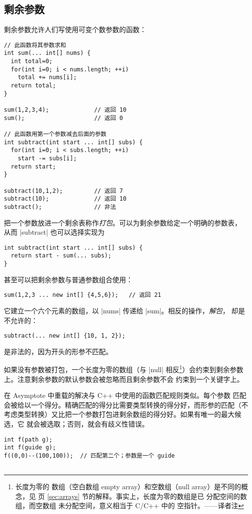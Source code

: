 \documentclass[nofonts,CJKnormalspaces]{ctexbook}[2009/05/20]
\newcommand*\prgname[1]{\textsf{#1}}
\newcommand\transnote[1]{\footnote{#1——译者注}}
\begin{document}
{{{\subsection{剩余参数}
\label{subsec:restarguments}

剩余参数允许人们写使用可变个数参数的函数：
\begin{lstlisting}
// 此函数将其参数求和
int sum(... int[] nums) {
  int total=0;
  for(int i=0; i < nums.length; ++i)
    total += nums[i];
  return total;
}

sum(1,2,3,4);             // 返回 10
sum();                    // 返回 0

// 此函数用第一个参数减去后面的参数
int subtract(int start ... int[] subs) {
  for(int i=0; i < subs.length; ++i)
    start -= subs[i];
  return start;
}

subtract(10,1,2);         // 返回 7
subtract(10);             // 返回 10
subtract();               // 非法
\end{lstlisting}

把一个参数放进一个剩余表称作\emph{打包}。可以为剩余参数给定一个明确的参数表，
从而 |subtract| 也可以选择实现为
\begin{lstlisting}
int subtract(int start ... int[] subs) {
  return start - sum(... subs);
}
\end{lstlisting}

甚至可以把剩余参数与普通参数组合使用：
\begin{lstlisting}
sum(1,2,3 ... new int[] {4,5,6});   // 返回 21
\end{lstlisting}
它建立一个六个元素的数组，以 |nums| 传递给 |sum|。相反的操作，\emph{解包}，
却是不允许的：
\begin{lstlisting}
subtract(... new int[] {10, 1, 2});
\end{lstlisting}
是非法的，因为开头的形参不匹配。

如果没有参数被打包，一个长度为零的数组（与 |null| 相反\transnote{长度为零的
数组（空白数组 empty array）和空数组（null array）是不同的概念，见
\pageref{sec:arrays} 页 \ref{sec:arrays} 节的解释。事实上，长度为零的数组是已
分配空间的数组，而空数组 \inlinecode{null} 未分配空间，意义相当于 C/C++ 中的
空指针。}）会约束到剩余参数上。注意剩余参数的默认参数会被忽略而且剩余参数不会
约束到一个关键字上。

在 \prgname{Asymptote} 中重载的解决与 C++ 中使用的函数匹配规则类似。每个参数
匹配会被给以一个得分。精确匹配的得分比需要类型转换的得分好，而形参的匹配（不
考虑类型转换）又比把一个参数打包进剩余数组的得分好。如果有唯一的最大候选，它
就会被选取；否则，就会有歧义性错误。
\begin{lstlisting}
int f(path g);
int f(guide g);
f((0,0)--(100,100));  // 匹配第二个；参数是一个 guide


\end{lstlisting}}}}
\end{document}
